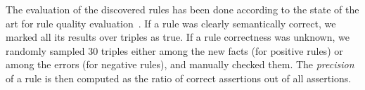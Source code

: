 The evaluation of the discovered rules 
has been done according to the state of the art for rule quality evaluation~\cite{galarraga2015fast}. If a rule was clearly semantically correct, we marked all its results over triples as true. If a rule correctness was unknown, we randomly sampled 30 triples either among the new facts (for positive rules) or among the errors (for negative rules), 
and manually checked them. %
The \emph{precision} of a rule is then computed as the ratio of correct assertions out of all assertions. 
